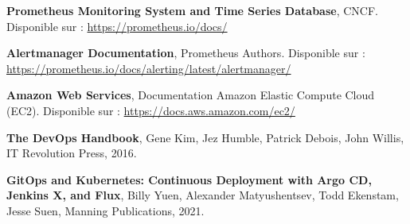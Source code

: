 \documentclass[12pt,a4paper,oneside]{report}
\begin{document}
\begin{enumerate}[label={[\arabic*]}]
    \item \textbf{Prometheus Monitoring System and Time Series Database}, CNCF. Disponible sur : \url{https://prometheus.io/docs/}
    \item \textbf{Alertmanager Documentation}, Prometheus Authors. Disponible sur : \url{https://prometheus.io/docs/alerting/latest/alertmanager/}
    \item \textbf{Amazon Web Services}, Documentation Amazon Elastic Compute Cloud (EC2). Disponible sur : \url{https://docs.aws.amazon.com/ec2/}
    \item \textbf{The DevOps Handbook}, Gene Kim, Jez Humble, Patrick Debois, John Willis, IT Revolution Press, 2016.
    \item \textbf{GitOps and Kubernetes: Continuous Deployment with Argo CD, Jenkins X, and Flux}, Billy Yuen, Alexander Matyushentsev, Todd Ekenstam, Jesse Suen, Manning Publications, 2021.
\end{enumerate}
\end{document}
